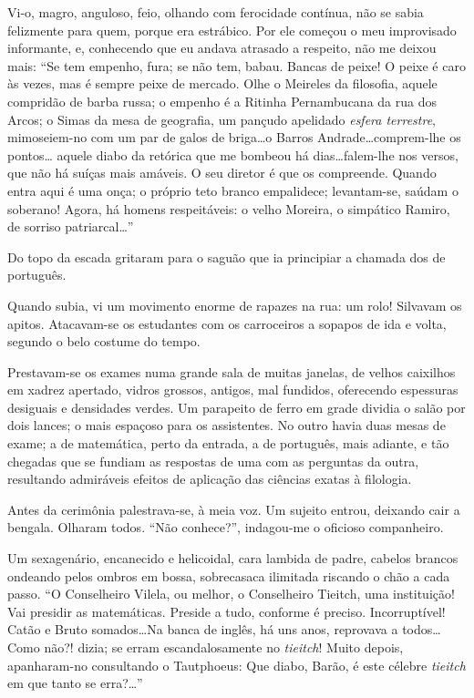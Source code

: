 Vi{}-o, magro, anguloso, feio, olhando com ferocidade contínua, não se
sabia felizmente para quem, porque era estrábico. Por ele começou o meu
improvisado informante, e, conhecendo que eu andava atrasado a
respeito, não me deixou mais: ``Se tem empenho, fura; se não tem, babau.
Bancas de peixe! O peixe é caro às vezes, mas é sempre peixe de
mercado. Olhe o Meireles da filosofia, aquele compridão de barba russa;
o empenho é a Ritinha Pernambucana da rua dos Arcos; o Simas da mesa de
geografia, um pançudo apelidado \textit{esfera terrestre}, mimoseiem{}-no com um
par de galos de briga\ldots o Barros Andrade\ldots comprem{}-lhe os pontos\ldots
aquele diabo da retórica que me bombeou há dias\ldots falem{}-lhe nos
versos, que não há suíças mais amáveis. O seu diretor é que os
compreende. Quando entra aqui é uma onça; o próprio teto branco
empalidece; levantam{}-se, saúdam o soberano! Agora, há homens
respeitáveis: o velho Moreira, o simpático Ramiro, de sorriso
patriarcal\ldots'' 

Do topo da escada gritaram para o saguão que ia
principiar a chamada dos de português. 

Quando subia, vi um movimento
enorme de rapazes na rua: um rolo! Silvavam os apitos. Atacavam{}-se os
estudantes com os carroceiros a sopapos de ida e volta, segundo o belo
costume do tempo. 

Prestavam{}-se os exames numa grande sala de muitas
janelas, de velhos caixilhos em xadrez apertado, vidros grossos,
antigos, mal fundidos, oferecendo espessuras desiguais e densidades
verdes. Um parapeito de ferro em grade dividia o salão por dois lances;
o mais espaçoso para os assistentes. No outro havia duas mesas de
exame; a de matemática, perto da entrada, a de português, mais adiante,
e tão chegadas que se fundiam as respostas de uma com as perguntas da
outra, resultando admiráveis efeitos de aplicação das ciências exatas à
filologia. 

Antes da cerimônia palestrava{}-se, à meia voz. Um sujeito
entrou, deixando cair a bengala. Olharam todos. ``Não conhece?'', 
indagou{}-me o oficioso companheiro. 

Um sexagenário, encanecido e
helicoidal, cara lambida de padre, cabelos brancos ondeando pelos
ombros em bossa, sobrecasaca ilimitada riscando o chão a cada passo. ``O
Conselheiro Vilela, ou melhor, o Conselheiro Tieitch, uma instituição!
Vai presidir as matemáticas. Preside a tudo, conforme é preciso.
Incorruptível! Catão e Bruto somados\ldots Na banca de inglês, há uns
anos, reprovava a todos\ldots Como não?! dizia; se erram escandalosamente
no \textit{tieitch}! Muito depois, apanharam{}-no consultando o Tautphoeus: Que
diabo, Barão, é este célebre \textit{tieitch} em que tanto se erra?\ldots'' 

